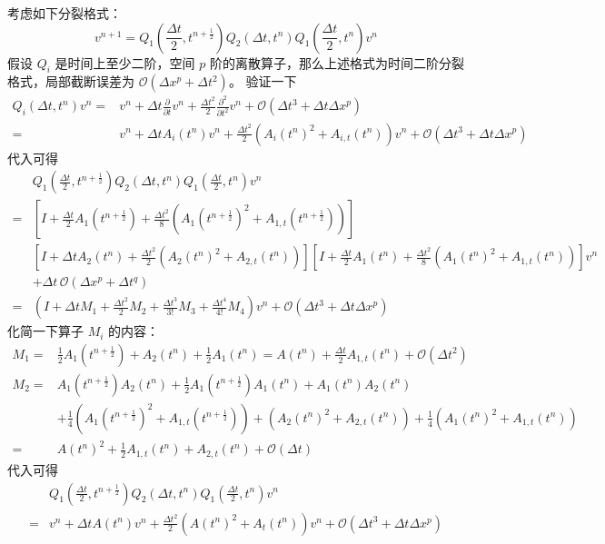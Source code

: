 考虑如下分裂格式：
\[
    v^{n+1} = Q_1(\frac{\Delta t}2,t^{n+\frac12}) Q_2(\Delta t,t^n) Q_1(\frac{\Delta t}2,t^n) v^n
\]
假设 $Q_i$ 是时间上至少二阶，空间 $p$ 阶的离散算子，那么上述格式为时间二阶分裂格式，局部截断误差为 $\mathcal{O}(\Delta x^p + \Delta t^2)$。
验证一下
\begin{align*}
    Q_i(\Delta t,t^n)v^n
    ={} & v^n
    + \Delta t \frac{\partial}{\partial t}v^n
    + \frac{\Delta t^2}2 \frac{\partial^2}{\partial t^2}v^n
    + \mathcal{O}(\Delta t^3 + \Delta t \Delta x^p) \\
    ={} & v^n
    + \Delta t A_i(t^n) v^n
    + \frac{\Delta t^2}2 \left(A_i(t^n)^2+ A_{i,t}(t^n) \right)v^n
    + \mathcal{O}(\Delta t^3 + \Delta t \Delta x^p)
\end{align*}
代入可得
\begin{align*}
        & Q_1(\frac{\Delta t}2,t^{n+\frac12}) Q_2(\Delta t,t^n) Q_1(\frac{\Delta t}2,t^n) v^n                                                                              \\
    ={} &
    \left[I
    + \frac{\Delta t}2 A_1(t^{n+\frac12})
    + \frac{\Delta t^2}8 \left(A_1(t^{n+\frac12})^2+A_{1,t}(t^{n+\frac12})\right)
    \right]                                                                                                                                                                \\
        & \left[I
    + \Delta t  A_2(t^{n})
    + \frac{\Delta t^2}2 \left(A_2(t^{n})^2+A_{2,t}(t^{n})\right)
    \right] \left[I
        + \frac{\Delta t}2 A_1(t^{n})
        + \frac{\Delta t^2}8 \left(A_1(t^{n})^2+ A_{1,t}(t^{n}) \right)
    \right] v^n                                                                                                                                                            \\
        & + \Delta t \,\mathcal{O}(\Delta x^p + \Delta t^q)
    \\
    ={} & \left(I+\Delta t M_1 + \frac{\Delta t^2}2 M_2 + \frac{\Delta t^3}{3!} M_3 + \frac{\Delta t^4}{4!} M_4\right) v^n + \mathcal{O}(\Delta t^3 + \Delta t \Delta x^p)
\end{align*}
化简一下算子 $M_i$ 的内容：
\begin{align*}
    M_1 ={} & \frac12 A_1(t^{n+\frac12}) + A_2(t^n) + \frac12 A_1(t^n) = A(t^n) + \frac{\Delta t}2 A_{1,t}(t^{n}) + \mathcal{O}(\Delta t^2) \\
    M_2 ={} &
    A_1(t^{n+\frac12}) A_2(t^{n}) + \frac12 A_1(t^{n+\frac12}) A_1(t^{n})
    + A_1(t^{n}) A_2(t^{n})                                                                                                                 \\
            & + \frac14 \left(A_1(t^{n+\frac12})^2+A_{1,t}(t^{n+\frac12})\right) +
    \left(A_2(t^{n})^2+A_{2,t}(t^{n})\right) +
    \frac14 \left(A_1(t^{n})^2+A_{1,t}(t^{n})\right)                                                                                        \\
    ={}     & A(t^n)^2 + \frac12 A_{1,t}(t^n) + A_{2,t}(t^n) + \mathcal{O}(\Delta t)
\end{align*}
代入可得
\begin{align*}
        & Q_1(\frac{\Delta t}2,t^{n+\frac12}) Q_2(\Delta t,t^n) Q_1(\frac{\Delta t}2,t^n) v^n                                      \\
    ={} & v^n + \Delta t A(t^n) v^n + \frac{\Delta t^2}2 (A(t^n)^2 + A_t(t^n)) v^n + \mathcal{O}(\Delta t^3 + \Delta t \Delta x^p)
\end{align*}
